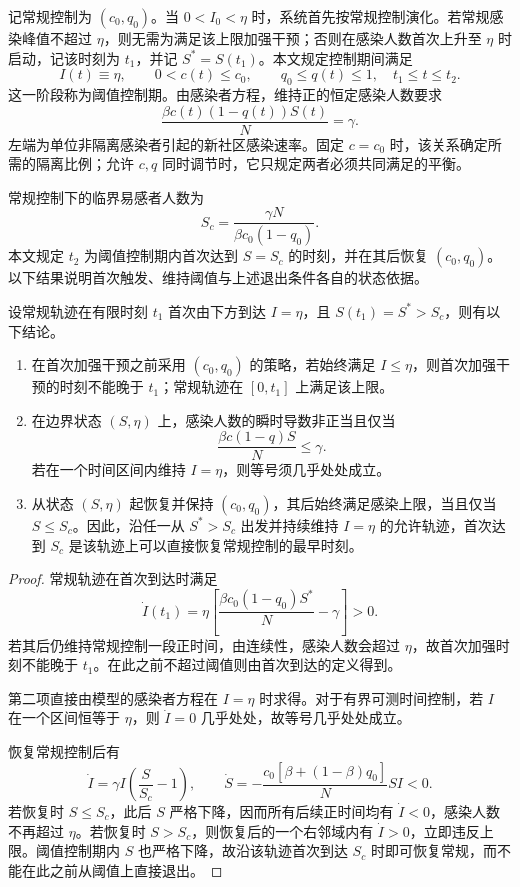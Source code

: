 \documentclass[lang=cn,a4paper,newtx]{elegantpaper}
\numberwithin{equation}{section}
\theoremstyle{plain}
\begin{document}
记常规控制为 $(c_0,q_0)$。当 $0<I_0<\eta$ 时，系统首先按常规控制演化。若常规感染峰值不超过 $\eta$，则无需为满足该上限加强干预；否则在感染人数首次上升至 $\eta$ 时启动，记该时刻为 $t_1$，并记 $S^*=S(t_1)$。本文规定控制期间满足
\begin{equation}
I(t)\equiv\eta,\qquad 0<c(t)\le c_0,\qquad q_0\le q(t)\le1,
\quad t_1\le t\le t_2.
\label{eq:model:plateau-requirement}
\end{equation}
这一阶段称为阈值控制期。由感染者方程，维持正的恒定感染人数要求
\begin{equation}
\frac{\beta c(t)(1-q(t))S(t)}{N}=\gamma.
\label{eq:model:balance}
\end{equation}
左端为单位非隔离感染者引起的新社区感染速率。固定 $c=c_0$ 时，该关系确定所需的隔离比例；允许 $c,q$ 同时调节时，它只规定两者必须共同满足的平衡。

常规控制下的临界易感者人数为
\begin{equation}
S_c=\frac{\gamma N}{\beta c_0(1-q_0)}.
\label{eq:model:Sc}
\end{equation}
本文规定 $t_2$ 为阈值控制期内首次达到 $S=S_c$ 的时刻，并在其后恢复 $(c_0,q_0)$。以下结果说明首次触发、维持阈值与上述退出条件各自的状态依据。

\begin{proposition}
\label{prop:model:threshold-rationale}
设常规轨迹在有限时刻 $t_1$ 首次由下方到达 $I=\eta$，且 $S(t_1)=S^*>S_c$，则有以下结论。
\begin{enumerate}
\renewcommand{\labelenumi}{(\roman{enumi})}
\item 在首次加强干预之前采用 $(c_0,q_0)$ 的策略，若始终满足 $I\le\eta$，则首次加强干预的时刻不能晚于 $t_1$；常规轨迹在 $[0,t_1]$ 上满足该上限。
\item 在边界状态 $(S,\eta)$ 上，感染人数的瞬时导数非正当且仅当
\[
\frac{\beta c(1-q)S}{N}\le\gamma.
\]
若在一个时间区间内维持 $I=\eta$，则等号须几乎处处成立。
\item 从状态 $(S,\eta)$ 起恢复并保持 $(c_0,q_0)$，其后始终满足感染上限，当且仅当 $S\le S_c$。因此，沿任一从 $S^*>S_c$ 出发并持续维持 $I=\eta$ 的允许轨迹，首次达到 $S_c$ 是该轨迹上可以直接恢复常规控制的最早时刻。
\end{enumerate}
\end{proposition}
\begin{proof}
常规轨迹在首次到达时满足
\[
\dot I(t_1)=\eta\left[\frac{\beta c_0(1-q_0)S^*}{N}-\gamma\right]>0.
\]
若其后仍维持常规控制一段正时间，由连续性，感染人数会超过 $\eta$，故首次加强时刻不能晚于 $t_1$。在此之前不超过阈值则由首次到达的定义得到。

第二项直接由模型的感染者方程在 $I=\eta$ 时求得。对于有界可测时间控制，若 $I$ 在一个区间恒等于 $\eta$，则 $\dot I=0$ 几乎处处，故等号几乎处处成立。

恢复常规控制后有
\[
\dot I=\gamma I\left(\frac{S}{S_c}-1\right),\qquad
\dot S=-\frac{c_0[\beta+(1-\beta)q_0]}{N}SI<0.
\]
若恢复时 $S\le S_c$，此后 $S$ 严格下降，因而所有后续正时间均有 $\dot I<0$，感染人数不再超过 $\eta$。若恢复时 $S>S_c$，则恢复后的一个右邻域内有 $\dot I>0$，立即违反上限。阈值控制期内 $S$ 也严格下降，故沿该轨迹首次到达 $S_c$ 时即可恢复常规，而不能在此之前从阈值上直接退出。
\end{proof}
\end{document}
